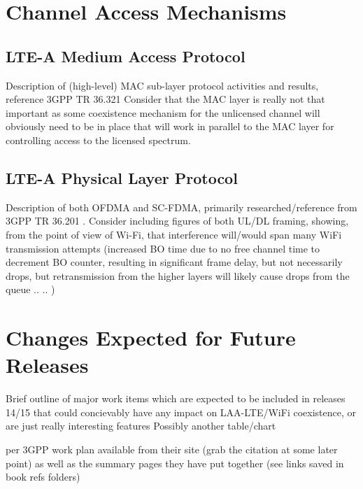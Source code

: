 \section{Channel Access Mechanisms}
\label{channel-access}

\subsection{LTE-A Medium Access Protocol}
\label{lte-mac}
Description of (high-level) MAC sub-layer protocol activities and results, reference 3GPP TR 36.321 \cite{tr36321}
Consider that the MAC layer is really not that important as some coexistence mechanism for the unlicensed channel will obviously need to be in place that will work in parallel to the MAC layer for controlling access to the licensed spectrum.


\subsection{LTE-A Physical Layer Protocol}
\label{lte-phy}
Description of both OFDMA and SC-FDMA, primarily researched/reference from 3GPP TR 36.201 \cite{tr36201}.  Consider including figures of both UL/DL framing, showing, from the point of view of Wi-Fi, that interference will/would span many WiFi transmission attempts (increased BO time due to no free channel time to decrement BO counter, resulting in significant frame delay, but not necessarily drops, but retransmission from the higher layers will likely cause drops from the queue .. ..  )


\section {Changes Expected for Future Releases}
\label{fut-chnge}
Brief outline of major work items which are expected to be included in releases 14/15 that could concievably have any impact on LAA-LTE/WiFi coexistence, or are just really interesting features 
Possibly another table/chart

per 3GPP work plan available from their site (grab the citation at some later point) as well as the summary pages they have put together (see links saved in book refs folders)
